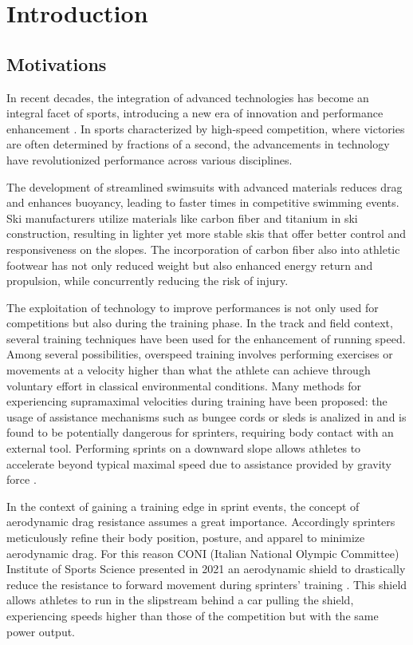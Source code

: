 \documentclass[a4paper,12pt,oneside]{book}
\begin{document}
\chapter*{Introduction}
	
\section*{Motivations}

In recent decades, the integration of advanced technologies has become an integral facet of sports, introducing a new era of innovation and performance enhancement \cite{Technology_athletics}. 
In sports characterized by high-speed competition, where victories are often determined by fractions of a second, the advancements in technology have revolutionized performance across various disciplines. 
\bigskip

The development of streamlined swimsuits with advanced materials reduces drag and enhances buoyancy, leading to faster times in competitive swimming events.
Ski manufacturers utilize materials like carbon fiber and titanium in ski construction, resulting in lighter yet more stable skis that offer better control and responsiveness on the slopes.
The incorporation of carbon fiber also into athletic footwear has not only reduced weight but also enhanced energy return and propulsion, while concurrently reducing the risk of injury.
\bigskip

The exploitation of technology to improve performances is not only used for competitions but also during the training phase. 
In the track and field context, several training techniques have been used for the enhancement of running speed. 
Among several possibilities, overspeed training involves performing exercises or movements at a velocity higher than what the athlete can achieve through voluntary effort in classical environmental conditions. 
Many methods for experiencing supramaximal velocities during training have been proposed: the usage of assistance mechanisms such as bungee cords or sleds is analized in \cite{Elastic_cord} and is found to be potentially dangerous for sprinters, requiring body contact with an external tool.
Performing sprints on a downward slope allows athletes to accelerate beyond typical maximal speed due to assistance provided by gravity force \cite{Hill_slope}.
\bigskip

In the context of gaining a training edge in sprint events, the concept of aerodynamic drag resistance assumes a great importance. 
Accordingly sprinters meticulously refine their body position, posture, and apparel to minimize aerodynamic drag. 
For this reason CONI (Italian National Olympic Committee) Institute of Sports Science presented in 2021 an aerodynamic shield to drastically reduce the resistance to forward movement during sprinters' training \cite{Coni_article}. 
This shield allows athletes to run in the slipstream behind a car pulling the shield, experiencing speeds higher than those of the competition but with the same power output. 
\bigskip
\end{document}
